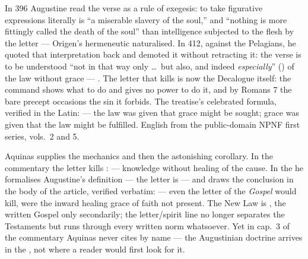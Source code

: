 \begin{witnessnote}
In 396 Augustine read the verse as a rule of exegesis: to take figurative
expressions literally is ``a miserable slavery of the soul,'' and ``nothing
is more fittingly called the death of the soul'' than intelligence subjected
to the flesh by the letter --- Origen's hermeneutic naturalised. In 412,
against the Pelagians, he quoted that interpretation back and demoted it
without retracting it: the verse is to be understood ``not in that way only
\dots\ but also, and indeed \textit{especially}'' ()
of the law without grace --- . The letter that kills is now the Decalogue itself: the
command shows what to do and gives no power to do it, and by Romans 7 the
bare precept occasions the sin it forbids. The treatise's celebrated
formula, verified in the Latin:  --- the law was given that
grace might be sought; grace was given that the law might be fulfilled.
English from the public-domain NPNF first series, vols.\ 2 and 5.
\end{witnessnote}

\begin{witnessnote}
Aquinas supplies the mechanics and then the astonishing corollary. In the
commentary the letter kills :  --- knowledge without healing of the cause. In the
 he formalises Augustine's definition --- the letter is
 --- and draws the conclusion
in the body of the article, verified verbatim:  --- even the
letter of the \textit{Gospel} would kill, were the inward healing grace of
faith not present. The New Law is , the written Gospel only secondarily; the letter/spirit
line no longer separates the Testaments but runs through every written norm
whatsoever. Yet in cap.~3 of the commentary Aquinas never cites  by name --- the Augustinian doctrine
arrives in the , not where a reader would first look for it.
\end{witnessnote}

